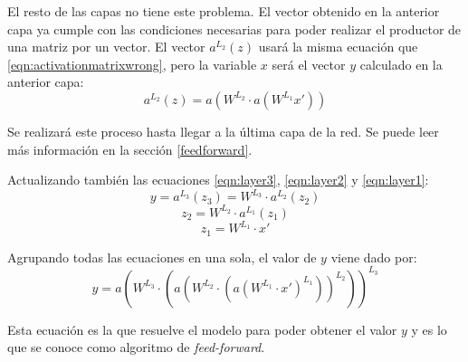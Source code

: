 El resto de las capas no tiene este problema. El vector obtenido en la anterior capa ya cumple con las condiciones necesarias para poder realizar el productor de una matriz por un vector. El vector $a^{L_2}(z)$ usará la misma ecuación que \ref{eqn:activationmatrixwrong}, pero la variable $x$ será el vector $y$ calculado en la anterior capa:
\begin{equation}
  a^{L_2}(z) = a(W^{L_2} \cdot a(W^{L_1}x'))
\end{equation}

Se realizará este proceso hasta llegar a la última capa de la red. Se puede leer más información en la sección \ref{feedforward}.
\newline


Actualizando también las ecuaciones \ref{eqn:layer3}, \ref{eqn:layer2} y \ref{eqn:layer1}:
\begin{equation}
    y = a^{L_3}(z_3) = W^{L_3} \cdot a^{L_2}(z_2) 
\end{equation}
\begin{equation}
    z_2 = W^{L_2} \cdot a^{L_1}(z_1)
\end{equation}
\begin{equation}
    z_1 = W^{L_1} \cdot x'
\end{equation}

Agrupando todas las ecuaciones en una sola, el valor de $y$ viene dado por:
\begin{equation}
    y = a(W^{L_3} \cdot (a(W^{L_2} \cdot (a(W^{L_1} \cdot x')^{L_1}))^{L_2}))^{L_3}
    \label{eqn:feedforwardexample}
\end{equation}

Esta ecuación es la que resuelve el modelo para poder obtener el valor $y$ y es lo que se conoce como algoritmo de \textit{feed-forward}.
\newline